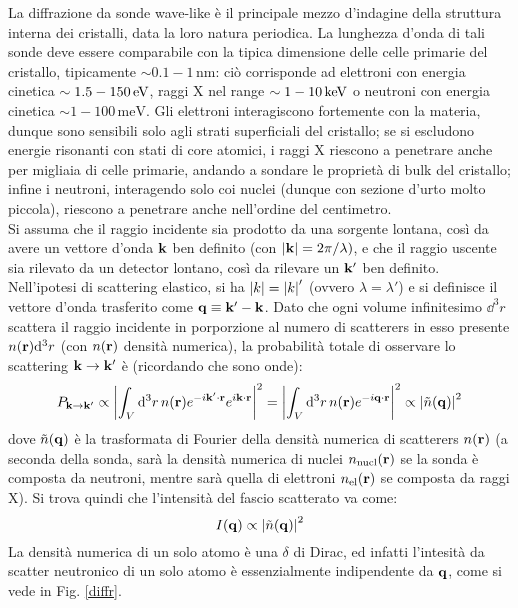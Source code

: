 La diffrazione da sonde wave-like è il principale mezzo d'indagine della struttura interna dei cristalli, data la loro natura periodica. La lunghezza d'onda di tali sonde deve essere comparabile con la tipica dimensione delle celle primarie del cristallo, tipicamente $ \sim 0.1 - 1 \,\text{nm} $: ciò corrisponde ad elettroni con energia cinetica $ \sim 1.5 - 150 \,\mathrm{eV} $, raggi X nel range $ \sim 1 - 10 \,\mathrm{keV} $ o neutroni con energia cinetica $ \sim 1 - 100 \,\text{meV} $. Gli elettroni interagiscono fortemente con la materia, dunque sono sensibili solo agli strati superficiali del cristallo; se si escludono energie risonanti con stati di core atomici, i raggi X riescono a penetrare anche per migliaia di celle primarie, andando a sondare le proprietà di bulk del cristallo; infine i neutroni, interagendo solo coi nuclei (dunque con sezione d'urto molto piccola), riescono a penetrare anche nell'ordine del centimetro. \\
Si assuma che il raggio incidente sia prodotto da una sorgente lontana, così da avere un vettore d'onda $ \mathbf{k} $ ben definito (con $ \left\lvert\mathbf{k}\right\rvert = 2\pi/\lambda) $, e che il raggio uscente sia rilevato da un detector lontano, così da rilevare un $ \mathbf{k}' $ ben definito. Nell'ipotesi di scattering elastico, si ha $ \left\lvert k\right\rvert = \left\lvert k\right\rvert' $ (ovvero $ \lambda = \lambda' $) e si definisce il vettore d'onda trasferito come $ \mathbf{q} \equiv \mathbf{k}' - \mathbf{k} $. Dato che ogni volume infinitesimo $ \dd^3r $ scattera il raggio incidente in porporzione al numero di scatterers in esso presente $ n(\mathbf{r}) \mathrm{d}^3r $ (con $ n(\mathbf{r}) $ densità numerica), la probabilità totale di osservare lo scattering $ \mathbf{k} \rightarrow \mathbf{k}' $ è (ricordando che sono onde):
\begin{equation*}
	P_{\mathbf{k} \rightarrow \mathbf{k}'} \propto \left\lvert\int_V \mathrm{d}^3r\, n(\mathbf{r}) e^{-i \mathbf{k}' \cdot \mathbf{r}} e^{i \mathbf{k} \cdot \mathbf{r}}\right\rvert^2 = \left\lvert\int_V \mathrm{d}^3r\, n(\mathbf{r}) e^{-i \mathbf{q} \cdot \mathbf{r}}\right\rvert^2 \propto \left\lvert\tilde{n}(\mathbf{q})\right\rvert^2
\end{equation*}
dove $ \tilde{n}(\mathbf{q}) $ è la trasformata di Fourier della densità numerica di scatterers $ n(\mathbf{r}) $ (a seconda della sonda, sarà la densità numerica di nuclei $ n_\text{nucl}(\mathbf{r}) $ se la sonda è composta da neutroni, mentre sarà quella di elettroni $ n_\text{el}(\mathbf{r}) $ se composta da raggi X). Si trova quindi che l'intensità del fascio scatterato va come:
\begin{equation}
	I(\mathbf{q}) \propto \left\lvert\tilde{n}(\mathbf{q})\right\rvert^2
\end{equation}
La densità numerica di un solo atomo è una $ \delta $ di Dirac, ed infatti l'intesità da scatter neutronico di un solo atomo è essenzialmente indipendente da $ \mathbf{q} $, come si vede in Fig. \ref{diffr}. \\
